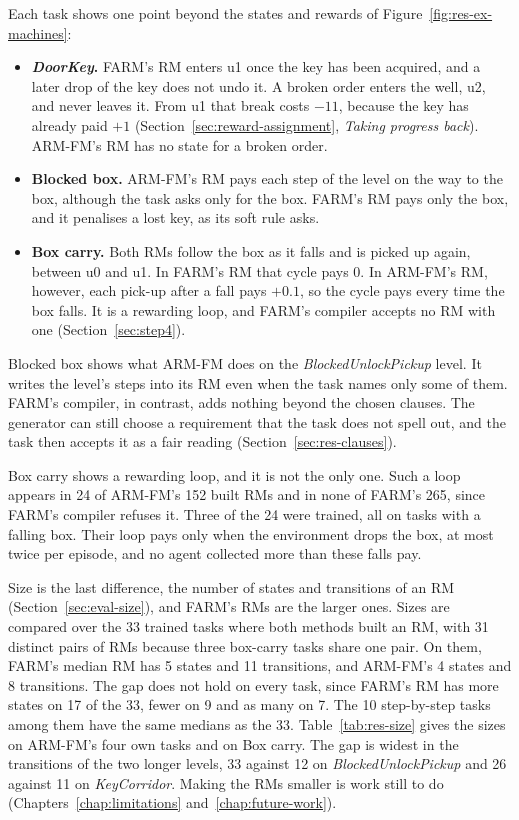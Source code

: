 \documentclass[11pt,english,listoffigures,listoftables]{tfgetsinf}
\newcommand{\env}[1]{\textsf{\slshape #1}}  %
\newcommand{\gain}[1]{\textcolor{green!40!black}{\bfseries\boldmath #1}}  %
\newcommand{\loss}[1]{\textcolor{red!60!black}{\bfseries\boldmath #1}}  %
\begin{document}
Each task shows one point beyond the states and rewards of Figure~\ref{fig:res-ex-machines}:
\begin{itemize}
    \item \textbf{\env{DoorKey}.} FARM's RM enters u1 once the key has been acquired, and a later drop of the key does not undo it. A broken order enters the well, u2, and never leaves it. From u1 that break costs \loss{$-11$}, because the key has already paid \gain{$+1$} (Section~\ref{sec:reward-assignment}, \emph{Taking progress back}). ARM-FM's RM has no state for a broken order.
    \item \textbf{Blocked box.} ARM-FM's RM pays each step of the level on the way to the box, although the task asks only for the box. FARM's RM pays only the box, and it penalises a lost key, as its soft rule asks.
    \item \textbf{Box carry.} Both RMs follow the box as it falls and is picked up again, between u0 and u1. In FARM's RM that cycle pays 0. In ARM-FM's RM, however, each pick-up after a fall pays \gain{$+0.1$}, so the cycle pays every time the box falls. It is a rewarding loop, and FARM's compiler accepts no RM with one (Section~\ref{sec:step4}).
\end{itemize}

Blocked box shows what ARM-FM does on the \env{BlockedUnlockPickup} level. It writes the level's steps into its RM even when the task names only some of them. FARM's compiler, in contrast, adds nothing beyond the chosen clauses. The generator can still choose a requirement that the task does not spell out, and the task then accepts it as a fair reading (Section~\ref{sec:res-clauses}).

Box carry shows a rewarding loop, and it is not the only one. Such a loop appears in 24 of ARM-FM's 152 built RMs and in none of FARM's 265, since FARM's compiler refuses it. Three of the 24 were trained, all on tasks with a falling box. Their loop pays only when the environment drops the box, at most twice per episode, and no agent collected more than these falls pay.

Size is the last difference, the number of states and transitions of an RM (Section~\ref{sec:eval-size}), and FARM's RMs are the larger ones. Sizes are compared over the 33 trained tasks where both methods built an RM, with 31 distinct pairs of RMs because three box-carry tasks share one pair. On them, FARM's median RM has 5 states and 11 transitions, and ARM-FM's 4 states and 8 transitions. The gap does not hold on every task, since FARM's RM has more states on 17 of the 33, fewer on 9 and as many on 7. The 10 step-by-step tasks among them have the same medians as the 33. Table~\ref{tab:res-size} gives the sizes on ARM-FM's four own tasks and on Box carry. The gap is widest in the transitions of the two longer levels, 33 against 12 on \env{BlockedUnlockPickup} and 26 against 11 on \env{KeyCorridor}. Making the RMs smaller is work still to do (Chapters~\ref{chap:limitations} and~\ref{chap:future-work}).
\end{document}
